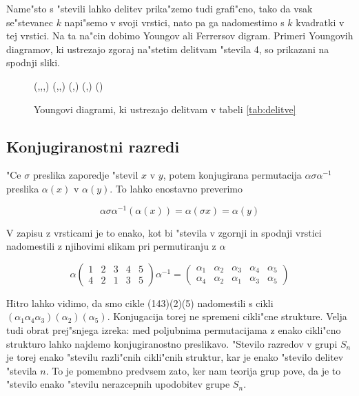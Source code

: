 \documentclass[a4paper,10pt]{article}
\begin{document}
 Name"sto s "stevili lahko delitev prika"zemo tudi grafi"cno, tako da vsak se"stevanec $k$ napi"semo v svoji vrstici, nato pa ga nadomestimo s $k$ kvadratki v tej vrstici. Na ta na"cin dobimo Youngov ali Ferrersov digram. Primeri Youngovih diagramov, ki ustrezajo zgoraj na"stetim delitvam "stevila 4, so prikazani na spodnji sliki.  
 
 \begin{figure}[h]
 \centering
  \young(\quad,\quad,\quad,\quad) \qquad
  \young(\quad\quad,\quad,\quad) \qquad
  \young(\quad\quad,\quad\quad) \qquad
  \young(\quad\quad\quad,\quad) \qquad
  \young(\quad\quad\quad\quad) \qquad
  \caption{Youngovi diagrami, ki ustrezajo delitvam v tabeli \ref{tab:delitve}}
  \label{fig:diagrami}
 \end{figure}

 
 \subsection{Konjugiranostni razredi}
 
  "Ce $\sigma$ preslika zaporedje "stevil $x$ v $y$, potem konjugirana permutacija $\alpha\sigma\alpha^{-1}$ preslika $\alpha(x)$ v $\alpha(y)$. To lahko enostavno preverimo
  
  $$\alpha\sigma\alpha^{-1}(\alpha(x)) = \alpha (\sigma x) = \alpha(y) $$
  
  V zapisu z vrsticami je to enako, kot bi "stevila v zgornji in spodnji vrstici nadomestili z njihovimi slikam pri permutiranju z $\alpha$
  
  $$\alpha\begin{pmatrix} 1 & 2 & 3 & 4 & 5 \\ 4 & 2 & 1 & 3 & 5\end{pmatrix} \alpha^{-1} = \begin{pmatrix} \alpha_1 & \alpha_2 & \alpha_3 & \alpha_4 & \alpha_5 \\ \alpha_4 & \alpha_2 & \alpha_1 & \alpha_3 & \alpha_5\end{pmatrix}$$
  
  Hitro lahko vidimo, da smo cikle (143)(2)(5) nadomestili s cikli $(\alpha_1 \alpha_4 \alpha_3)(\alpha_2)(\alpha_5)$. Konjugacija torej ne spremeni cikli"cne strukture. Velja tudi obrat prej"snjega izreka: med poljubnima permutacijama z enako cikli"cno strukturo lahko najdemo konjugiranostno preslikavo. "Stevilo razredov v grupi $S_n$ je torej enako "stevilu razli"cnih cikli"cnih struktur, kar je enako "stevilo delitev "stevila $n$. To je pomembno predvsem zato, ker nam teorija grup pove, da je to "stevilo enako "stevilu nerazcepnih upodobitev grupe $S_n$. 
  
\end{document}

